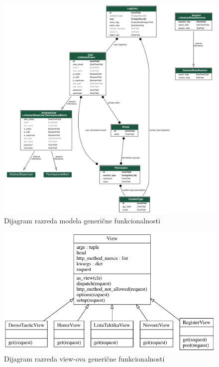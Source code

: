			\begin{figure}[H]
					\centerfloat
					\advance{}
        					\includegraphics[scale=0.45]{dijagrami/ModelsClassDiagram1.png} %
        					\caption{Dijagram razreda modela generične funkcionalnosti}
        					\label{fig:DijagramRazredaModel}
			\end{figure}
			
			\begin{figure}[H]
					\centerfloat
					\advance{}
        					\includegraphics[scale=0.65]{dijagrami/ViewClassDiagram1.png} %
        					\caption{Dijagram razreda view-ova generične funkcionalnosti}
        					\label{fig:DijagramRazredaView}
			\end{figure}
			
